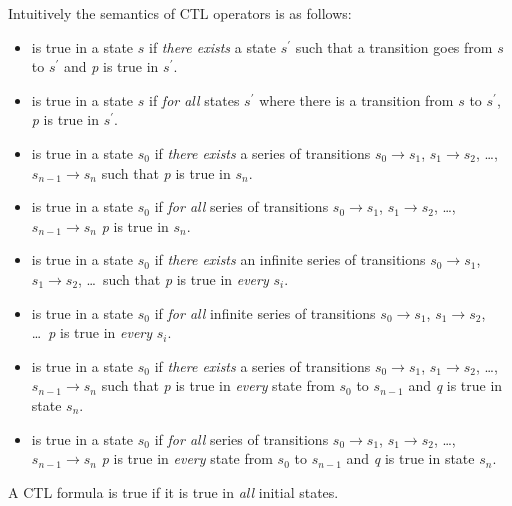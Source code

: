 Intuitively the semantics of CTL operators is as follows:
% 
\begin{itemize}
  \item {}
        is true in a state $s$ if \emph{there exists} a state
        $s^\prime$ such that a transition goes from $s$ to $s^\prime$
        and \textit{p} is true in $s^\prime$.
  \item {}
        is true in a state $s$ if \emph{for all} states $s^\prime$
        where there is a transition from $s$ to $s^\prime$, \textit{p}
        is true in $s^\prime$.
  \item {}
       is true in a state $s_0$ if \emph{there exists} a series of
       transitions $s_0 \rightarrow s_1$, $s_1 \rightarrow s_2$,
       \ldots, $s_{n-1} \rightarrow s_n$ such that \textit{p} is true
       in $s_n$.
  \item {}
       is true in a state $s_0$ if \emph{for all} series of
       transitions $s_0 \rightarrow s_1$, $s_1 \rightarrow s_2$,
       \ldots, $s_{n-1} \rightarrow s_n$ \textit{p} is true in $s_n$.

  \item {}
       is true in a state $s_0$ if \emph{there exists} an infinite
       series of transitions $s_0 \rightarrow s_1$, $s_1 \rightarrow
       s_2$, \ldots~such that \textit{p} is true in \emph{every}
       $s_i$.
  \item {}
       is true in a state $s_0$ if \emph{for all} infinite series of
       transitions $s_0 \rightarrow s_1$, $s_1 \rightarrow s_2$,
       \ldots~\textit{p} is true in \emph{every} $s_i$.
  \item {}
       is true in a state $s_0$ if \emph{there exists} a series of
       transitions $s_0 \rightarrow s_1$, $s_1 \rightarrow s_2$,
       \ldots, $s_{n-1} \rightarrow s_n$ such that \textit{p} is true
       in \emph{every} state from $s_0$ to $s_{n-1}$ and \textit{q} is
       true in state $s_n$.
  \item {}
       is true in a state $s_0$ if \emph{for all} series of
       transitions $s_0 \rightarrow s_1$, $s_1 \rightarrow s_2$,
       \ldots, $s_{n-1} \rightarrow s_n$ \textit{p} is true in
       \emph{every} state from $s_0$ to $s_{n-1}$ and \textit{q} is
       true in state $s_n$.
\end{itemize}
A CTL formula is true if it is true in \emph{all} initial states.

